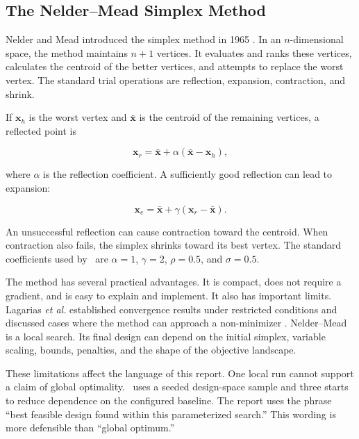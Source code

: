 \subsection{The Nelder--Mead Simplex Method}
\label{sec:nelder-mead-review}

Nelder and Mead introduced the simplex method in 1965 \cite{nelder1965}. In an
$n$-dimensional space, the method maintains $n+1$ vertices. It evaluates and
ranks these vertices, calculates the centroid of the better vertices, and
attempts to replace the worst vertex. The standard trial operations are
reflection, expansion, contraction, and shrink.

If $\mathbf{x}_h$ is the worst vertex and $\bar{\mathbf{x}}$ is the centroid
of the remaining vertices, a reflected point is

\begin{equation}
\mathbf{x}_r=\bar{\mathbf{x}}+
\alpha(\bar{\mathbf{x}}-\mathbf{x}_h),
\label{eq:nm-reflection}
\end{equation}

where $\alpha$ is the reflection coefficient. A sufficiently good reflection
can lead to expansion:

\begin{equation}
\mathbf{x}_e=\bar{\mathbf{x}}+
\gamma(\mathbf{x}_r-\bar{\mathbf{x}}).
\label{eq:nm-expansion}
\end{equation}

An unsuccessful reflection can cause contraction toward the centroid. When
contraction also fails, the simplex shrinks toward its best vertex. The
standard coefficients used by \NEMO\ are $\alpha=1$, $\gamma=2$, $\rho=0.5$,
and $\sigma=0.5$.

The method has several practical advantages. It is compact, does not require a
gradient, and is easy to explain and implement. It also has important limits.
Lagarias \emph{et al.} established convergence results under restricted
conditions and discussed cases where the method can approach a non-minimizer
\cite{lagarias1998}. Nelder--Mead is a local search. Its final design can
depend on the initial simplex, variable scaling, bounds, penalties, and the
shape of the objective landscape.

These limitations affect the language of this report. One local run cannot
support a claim of global optimality. \NEMO\ uses a seeded design-space sample
and three starts to reduce dependence on the configured baseline. The report
uses the phrase ``best feasible design found within this parameterized
search.'' This wording is more defensible than ``global optimum.''

